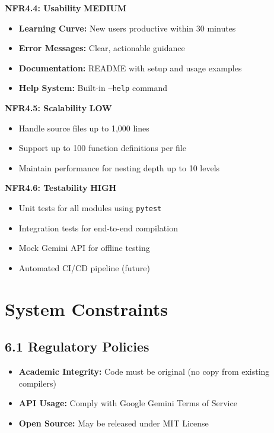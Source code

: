 \documentclass[a4paper,11pt]{article}
\newcommand{\priority}[1]{\colorbox{red!20}{\textbf{#1}}}
\newcommand{\prioritymed}[1]{\colorbox{yellow!20}{\textbf{#1}}}
\newcommand{\prioritylow}[1]{\colorbox{green!20}{\textbf{#1}}}
\begin{document}
\textbf{NFR4.4: Usability} \prioritymed{MEDIUM}

\begin{itemize}
    \item \textbf{Learning Curve:} New users productive within 30 minutes
    \item \textbf{Error Messages:} Clear, actionable guidance
    \item \textbf{Documentation:} README with setup and usage examples
    \item \textbf{Help System:} Built-in \texttt{--help} command
\end{itemize}

\textbf{NFR4.5: Scalability} \prioritylow{LOW}

\begin{itemize}
    \item Handle source files up to 1,000 lines
    \item Support up to 100 function definitions per file
    \item Maintain performance for nesting depth up to 10 levels
\end{itemize}

\textbf{NFR4.6: Testability} \priority{HIGH}

\begin{itemize}
    \item Unit tests for all modules using \texttt{pytest}
    \item Integration tests for end-to-end compilation
    \item Mock Gemini API for offline testing
    \item Automated CI/CD pipeline (future)
\end{itemize}

\clearpage

\section{System Constraints}

\subsection{6.1 Regulatory Policies}

\begin{itemize}
    \item \textbf{Academic Integrity:} Code must be original (no copy from existing compilers)
    \item \textbf{API Usage:} Comply with Google Gemini Terms of Service
    \item \textbf{Open Source:} May be released under MIT License
\end{itemize}
\end{document}
